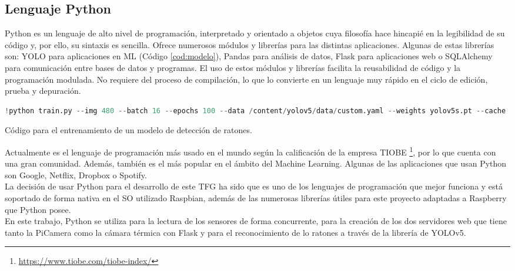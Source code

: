 \subsection{Lenguaje Python}
\label{sec:python}
Python es un lenguaje de alto nivel de programación, interpretado y orientado a objetos cuya filosofía hace hincapié en la legibilidad de su código y, por ello, su sintaxis es sencilla. Ofrece numerosos módulos y librerías para las distintas aplicaciones. Algunas de estas librerías son: YOLO para aplicaciones en ML (Código \ref{cod:modelo}), Pandas para análisis de datos, Flask para aplicaciones web o SQLAlchemy para comunicación entre bases de datos y programas. El uso de estos módulos y librerías facilita la reusabilidad de código y la programación modulada. No requiere del proceso de compilación, lo que lo convierte en un lenguaje muy rápido en el ciclo de edición, prueba y depuración.\\
\begin{code}[h]
\begin{lstlisting}[language=Python]
!python train.py --img 480 --batch 16 --epochs 100 --data /content/yolov5/data/custom.yaml --weights yolov5s.pt --cache
\end{lstlisting}
\caption[Código para el entrenamiento de un modelo de detección de ratones.]{Código para el entrenamiento de un modelo de detección de ratones.}
\label{cod:modelo}
\end{code}

Actualmente es el lenguaje de programación más usado en el mundo según la calificación de la empresa TIOBE \footnote{\url{https://www.tiobe.com/tiobe-index/}}, por lo que cuenta con una gran comunidad. Además, también es el más popular en el ámbito del Machine Learning. Algunas de las aplicaciones que usan Python son Google, Netflix, Dropbox o Spotify.\\

La decisión de usar Python para el desarrollo de este TFG ha sido que es uno de los lenguajes de programación que mejor funciona y está soportado de forma nativa en el SO utilizado Raspbian, además de las numerosas librerías útiles para este proyecto adaptadas a Raspberry que Python posee.\\

En este trabajo, Python se utiliza para la lectura de los sensores de forma concurrente, para la creación de los dos servidores web que tiene tanto la PiCamera como la cámara térmica con Flask y para el reconocimiento de lo ratones a través de la librería de YOLOv5.\\


